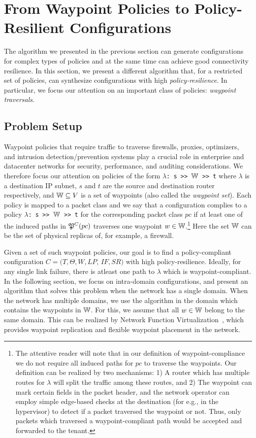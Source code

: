 \section{From Waypoint Policies to Policy-Resilient Configurations}
\label{sec:waypointres}


The algorithm we presented in the previous section can generate configurations
for complex types of policies and at the same time can achieve good
connectivity resilience.
In this section, we present a different algorithm that, for a restricted set of policies,
can synthesize configurations with high \emph{policy-resilience}.
In particular, we focus our attention on an important class of
policies:  \emph{waypoint traversals}.

\subsection{Problem Setup}
Waypoint policies 
that require traffic to traverse
firewalls,
proxies, optimizers, and intrusion detection/prevention 
systems 
play a crucial role in enterprise and
datacenter networks for security, performance,  
and auditing considerations.
We therefore focus our attention on policies of the form 
\texttt{$\lambda$: s >> $\mathbb{W}$ >> t}
where $\lambda$ is a destination IP subnet,  
$s$ and $t$ are the source and destination router respectively, 
and $\mathbb{W} \subseteq V$ is a set of waypoints (also called the \emph{waypoint set}). 
Each policy is mapped to a packet class and
we say that a configuration complies to a policy 
\texttt{$\lambda$: s >> $\mathbb{W}$ >> t}
 for the corresponding packet class
$pc$ if
at least one of the induced paths in $\mathfrak{P}^C(pc)$ 
traverses one waypoint $w \in \mathbb{W}$.\footnote{
The attentive reader will note that in our definition of waypoint-compliance 
we do not require all induced paths for $pc$ to traverse the waypoints. 
Our 
definition can be realized by two mechanisms: 1) A router
which has multiple routes for $\lambda$ will split the traffic
among these routes, and 2) The waypoint can mark certain fields in
the packet header, and the network operator can employ 
simple edge-based checks at the destination 
(for e.g., in the hypervisor) to 
detect if a packet traversed the waypoint or not. Thus, only
packets which traversed a waypoint-compliant path would be 
accepted and forwarded to the tenant. 
}
Here the set $\mathbb{W}$
can be the set of physical replicas of,  for example, a firewall.


 Given a set of such waypoint policies, our goal is to
find a policy-compliant configuration 
$C=(T,\Theta,W,LP$, $IF,SR)$ 
with high policy-resilience. Ideally, for 
any single link failure, there is atleast 
one path to $\lambda$ which is waypoint-compliant. 
In the following section, we focus on 
intra-domain configurations,
and present an algorithm
that solves this problem when the network 
has a single domain.
When the network has multiple domains, 
we use the algorithm in the domain 
which contains the waypoints in $\mathbb{W}$. 
For this, we assume that all $w \in \mathbb{W}$ 
belong to the same domain. This can be realized 
by Network Function Virtualization~\cite{opennf, netbricks},
which provides waypoint replication and 
 flexible waypoint placement in the network.


